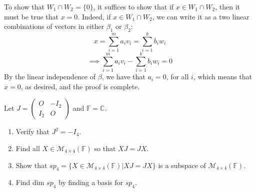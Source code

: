 \documentclass{article}
\theoremstyle{plain} %
\numberwithin{thm}{section} %
\theoremstyle{definition}
\begin{document}
\begin{question}{9}
        To show that \(W_1 \cap W_2 = \{ 0 \}\), it suffices to show that if \(x \in W_1 \cap W_2\), then it must be true that \(x = 0\). Indeed, if \(x \in W_1 \cap W_2\), we can write it as a two linear combinations of vectors in either \(\beta _1\) or \(\beta _2\):
        \[
            x = \sum_{i=1}^{m} a_i v_i = \sum_{i=1}^{k} b_i w_i
        \]
        \[
            \implies \sum_{i=1}^{m} a_i v_i - \sum_{i=1}^{k} b_i w_i = 0
        \]
        By the linear independence of \(\beta\), we have that \(a_i = 0\), for all \(i\), which means that \(x = 0\), as desired, and the proof is complete.
    \end{question}
    \newpage
    \begin{question}{10}
        Let \( J = \left( \begin{array}{c|c} O & -I_2 \\ \hline I_2 & O \end{array} \right) \) and \( \mathbb{F} = \mathbb{C} \).
        
        \begin{enumerate}
            \item Verify that \( J^2 = -I_4 \).
            \item Find all \( X \in \mathcal{M}_{4\times 4}(\mathbb{F}) \) so that \( XJ = JX \).
            \item Show that \( sp_4 = \{ X \in \mathcal{M}_{4\times 4}(\mathbb{F}) | XJ = JX \} \) is a subspace of \( \mathcal{M}_{4\times 4}(\mathbb{F}) \).
            \item Find dim \( sp_4 \) by finding a basis for \( sp_4 \).
        \end{enumerate}
    \end{question}
    \newpage
\end{document}
